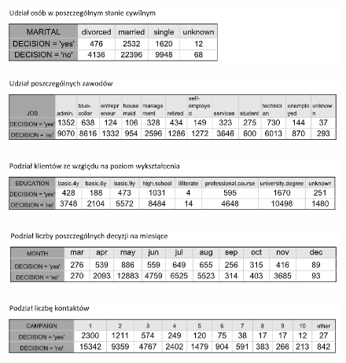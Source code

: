 \documentclass[12pt,a4paper]{article}
\begin{document}
\begin{figure}[H]
	\centering
	\includegraphics[scale=0.65]{data_3.png}
\end{figure}

\begin{figure}[H]
	\centering
	\includegraphics[scale=0.65]{data_4.png}
\end{figure}

\begin{figure}[H]
	\centering
	\includegraphics[scale=0.65]{data_5.png}
\end{figure}

\begin{figure}[H]
	\centering
	\includegraphics[scale=0.65]{data_6.png}
\end{figure}

\begin{figure}[H]
	\centering
	\includegraphics[scale=0.65]{data_7.png}
\end{figure}
\end{document}
